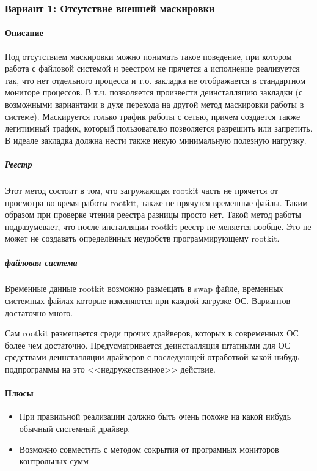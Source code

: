 \subsubsection{Вариант 1: Отсутствие внешней маскировки}
\paragraph{Описание}

Под отсутствием маскировки можно понимать такое поведение, при котором работа с
файловой системой и реестром не прячется а исполнение реализуется так, что нет
отдельного процесса и т.о. закладка не отображается в стандартном мониторе процессов.
В т.ч. позволяется произвести деинсталляцию закладки (с возможными вариантами в духе
перехода на другой метод маскировки работы в системе). Маскируется только трафик работы
с сетью, причем создается также легитимный трафик, который пользователю позволяется разрешить
или запретить. В идеале закладка должна нести также некую минимальную полезную нагрузку.

\subparagraph{Реестр\\}

Этот метод состоит в том, что загружающая rootkit часть не прячется от
просмотра во время работы rootkit, также не прячутся временные файлы.
Таким образом при проверке чтения реестра разницы просто нет. Такой метод
работы подразумевает, что после инсталляции rootkit реестр не меняется вообще.
Это не может не создавать определённых неудобств программирующему rootkit.

\subparagraph{файловая система\\}

Временные данные rootkit возможно размещать в swap файле,
временных системных файлах которые изменяются при каждой
загрузке ОС. Вариантов достаточно много.

Сам rootkit размещается среди прочих драйверов, которых в
современных ОС более чем достаточно. Предусматривается
деинсталляция штатными для ОС средствами деинсталляции драйверов
с последующей отработкой какой нибудь подпрограммы на это
<<недружественное>> действие.

\paragraph{Плюсы\\}

\begin{itemize}
\item{При правильной реализации должно быть очень похоже на какой нибудь обычный системный драйвер.}
\item{Возможно совместить с методом сокрытия от програмных мониторов контрольных сумм}
\end{itemize}

